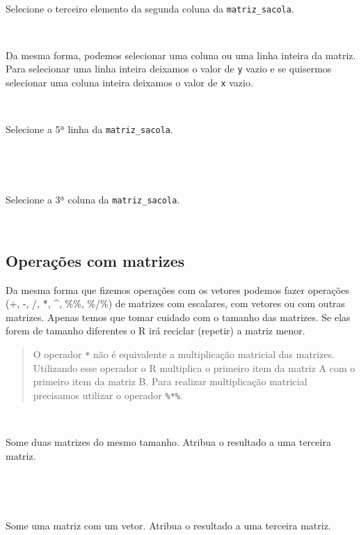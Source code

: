 \documentclass[]{book}
\theoremstyle{definition}
\theoremstyle{definition}
\theoremstyle{definition}
\theoremstyle{remark}
\let\BeginKnitrBlock\begin \let\EndKnitrBlock\end
\begin{document}
~
\BeginKnitrBlock{exercise}
\protect\hypertarget{exr:unnamed-chunk-60}{}{\label{exr:unnamed-chunk-60} }Selecione o terceiro elemento da segunda coluna da \texttt{matriz\_sacola}.
\EndKnitrBlock{exercise}

~

Da mesma forma, podemos selecionar uma coluna ou uma linha inteira da matriz. Para selecionar uma linha inteira deixamos o valor de \texttt{y} vazio e se quisermos selecionar uma coluna inteira deixamos o valor de \texttt{x} vazio.

~
\BeginKnitrBlock{exercise}
\protect\hypertarget{exr:unnamed-chunk-61}{}{\label{exr:unnamed-chunk-61} }Selecione a 5ª linha da \texttt{matriz\_sacola}.
\EndKnitrBlock{exercise}

~

~
\BeginKnitrBlock{exercise}
\protect\hypertarget{exr:unnamed-chunk-62}{}{\label{exr:unnamed-chunk-62} }Selecione a 3ª coluna da \texttt{matriz\_sacola}.
\EndKnitrBlock{exercise}

~

\hypertarget{operauxe7uxf5es-com-matrizes}{%
\subsection{Operações com matrizes}\label{operauxe7uxf5es-com-matrizes}}

Da mesma forma que fizemos operações com os vetores podemos fazer operações (+, -, /, *, \^{}, \%\%, \%/\%) de matrizes com escalares, com vetores ou com outras matrizes. Apenas temos que tomar cuidado com o tamanho das matrizes. Se elas forem de tamanho diferentes o R irá reciclar (repetir) a matriz menor.

\begin{quote}
O operador \texttt{*} não é equivalente a multiplicação matricial das matrizes. Utilizando esse operador o R multiplica o primeiro item da matriz A com o primeiro item da matriz B. Para realizar multiplicação matricial precisamos utilizar o operador \texttt{\%*\%}.
\end{quote}

~
\BeginKnitrBlock{exercise}
\protect\hypertarget{exr:unnamed-chunk-63}{}{\label{exr:unnamed-chunk-63} }Some duas matrizes do mesmo tamanho. Atribua o resultado a uma terceira matriz.
\EndKnitrBlock{exercise}

~

~
\BeginKnitrBlock{exercise}
\protect\hypertarget{exr:unnamed-chunk-64}{}{\label{exr:unnamed-chunk-64} }Some uma matriz com um vetor. Atribua o resultado a uma terceira matriz.
\EndKnitrBlock{exercise}
\end{document}
